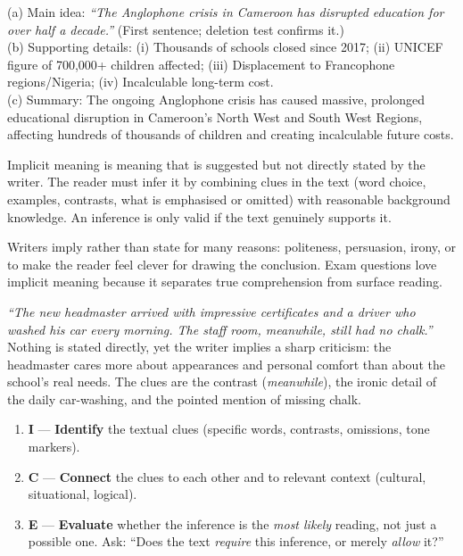 \documentclass[11pt]{article}
\newcommand{\cle}[1]{{\popxbold\color{popdark}#1}}
\newcounter{popsec}
\newcounter{popsub}
\newcommand{\courssub}[1]{%
  \stepcounter{popsub}%
  \par\vspace{9pt}\noindent{\popxbold\fontsize{11.5}{13}\selectfont\color{popink}{\color{poporange}\thepopsec.\thepopsub}\hspace{6pt}#1}\par\nopagebreak\vspace{4pt}
}
\begin{document}
\begin{corrige}
(a) Main idea: \emph{``The Anglophone crisis in Cameroon has disrupted education for over half a decade.''} (First sentence; deletion test confirms it.)\\
(b) Supporting details: (i) Thousands of schools closed since 2017; (ii) UNICEF figure of 700,000+ children affected; (iii) Displacement to Francophone regions/Nigeria; (iv) Incalculable long-term cost.\\
(c) Summary: The ongoing Anglophone crisis has caused massive, prolonged educational disruption in Cameroon's North West and South West Regions, affecting hundreds of thousands of children and creating incalculable future costs.
\end{corrige}

\courssub{Inferring Implicit Meaning}

\begin{definition}
\cle{Implicit meaning} is meaning that is suggested but not directly stated by the writer. The reader must infer it by combining clues in the text (word choice, examples, contrasts, what is emphasised or omitted) with reasonable background knowledge. An inference is only valid if the text genuinely supports it.
\end{definition}

Writers imply rather than state for many reasons: politeness, persuasion, irony, or to make the reader feel clever for drawing the conclusion. Exam questions love implicit meaning because it separates true comprehension from surface reading.

\begin{exemplebox}
\emph{``The new headmaster arrived with impressive certificates and a driver who washed his car every morning. The staff room, meanwhile, still had no chalk.''}\\
Nothing is stated directly, yet the writer implies a sharp criticism: the headmaster cares more about appearances and personal comfort than about the school's real needs. The clues are the contrast (\emph{meanwhile}), the ironic detail of the daily car-washing, and the pointed mention of missing chalk.
\end{exemplebox}

\begin{methode}
\begin{enumerate}
\item \textbf{I} --- \textbf{Identify} the textual clues (specific words, contrasts, omissions, tone markers).
\item \textbf{C} --- \textbf{Connect} the clues to each other and to relevant context (cultural, situational, logical).
\item \textbf{E} --- \textbf{Evaluate} whether the inference is the \emph{most likely} reading, not just a possible one. Ask: ``Does the text \emph{require} this inference, or merely \emph{allow} it?''
\end{enumerate}
\end{methode}
\end{document}
